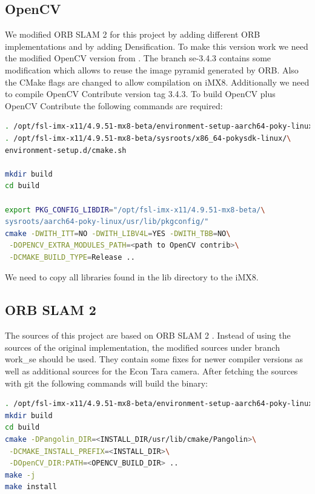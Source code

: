 \documentclass[11pt,a4paper,titlepage,oneside]{report}
\begin{document}
\subsection{OpenCV}\label{sec:opencv}
We modified ORB SLAM 2 for this project by adding different ORB implementations and by adding Densification. To make this version work we need the modified OpenCV version from \cite{opencv_se}. The branch se-3.4.3 contains some modification which allows to reuse the image pyramid generated by ORB. Also the CMake flags are changed to allow compilation on iMX8. Additionally we need to compile OpenCV Contribute \cite{opencv_contrib} version tag 3.4.3. To build OpenCV plus OpenCV Contribute the following commands are required:
\begin{lstlisting}[language=bash]
. /opt/fsl-imx-x11/4.9.51-mx8-beta/environment-setup-aarch64-poky-linux
. /opt/fsl-imx-x11/4.9.51-mx8-beta/sysroots/x86_64-pokysdk-linux/\
environment-setup.d/cmake.sh

mkdir build
cd build

export PKG_CONFIG_LIBDIR="/opt/fsl-imx-x11/4.9.51-mx8-beta/\
sysroots/aarch64-poky-linux/usr/lib/pkgconfig/"
cmake -DWITH_ITT=NO -DWITH_LIBV4L=YES -DWITH_TBB=NO\
 -DOPENCV_EXTRA_MODULES_PATH=<path to OpenCV contrib>\
 -DCMAKE_BUILD_TYPE=Release ..
\end{lstlisting}

We need to copy all libraries found in the lib directory to the iMX8.

\subsection{ORB SLAM 2}\label{sec:orbslam_build}
The sources of this project are based on ORB SLAM 2 \cite{orbslam2_impl}. Instead of using the sources of the original implementation, the modified sources \cite{orbslam2_se} under branch work\_se should be used. They contain some fixes for newer compiler versions as well as additional sources for the Econ Tara camera. After fetching the sources with git the following commands will build the binary:\\
\begin{lstlisting}[language=bash]
. /opt/fsl-imx-x11/4.9.51-mx8-beta/environment-setup-aarch64-poky-linux
mkdir build
cd build
cmake -DPangolin_DIR=<INSTALL_DIR/usr/lib/cmake/Pangolin>\
 -DCMAKE_INSTALL_PREFIX=<INSTALL_DIR>\
 -DOpenCV_DIR:PATH=<OPENCV_BUILD_DIR> ..
make -j
make install
\end{lstlisting}
\end{document}
